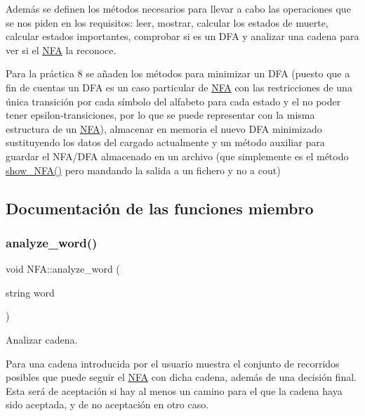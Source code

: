 Además se definen los métodos necesarios para llevar a cabo las operaciones que se nos piden en los requisitos\+: leer, mostrar, calcular los estados de muerte, calcular estados importantes, comprobar si es un D\+FA y analizar una cadena para ver si el \mbox{\hyperlink{class_n_f_a}{N\+FA}} la reconoce.

Para la práctica 8 se añaden los métodos para minimizar un D\+FA (puesto que a fin de cuentas un D\+FA es un caso particular de \mbox{\hyperlink{class_n_f_a}{N\+FA}} con las restricciones de una única transición por cada símbolo del alfabeto para cada estado y el no poder tener epsilon-\/transiciones, por lo que se puede representar con la misma estructura de un \mbox{\hyperlink{class_n_f_a}{N\+FA}}), almacenar en memoria el nuevo D\+FA minimizado sustituyendo los datos del cargado actualmente y un método auxiliar para guardar el N\+F\+A/\+D\+FA almacenado en un archivo (que simplemente es el método \mbox{\hyperlink{class_n_f_a_a53a6b0ddcfb706dc4725cf2a6a8f2388}{show\+\_\+\+N\+F\+A()}} pero mandando la salida a un fichero y no a cout) 

\subsection{Documentación de las funciones miembro}
\mbox{\label{class_n_f_a_a7cad5fd6ba765d9d8099793421100234}} 
\subsubsection{\texorpdfstring{analyze\+\_\+word()}{analyze\_word()}}
{\footnotesize\ttfamily void N\+F\+A\+::analyze\+\_\+word (\begin{DoxyParamCaption}\item[{string}]{word }\end{DoxyParamCaption})}



Analizar cadena. 

Para una cadena introducida por el usuario muestra el conjunto de recorridos posibles que puede seguir el \mbox{\hyperlink{class_n_f_a}{N\+FA}} con dicha cadena, además de una decisión final. Esta será de aceptación si hay al menos un camino para el que la cadena haya sido aceptada, y de no aceptación en otro caso. \mbox{\label{class_n_f_a_aaadda0fc1d4ebc279cbb25a8486a8b72}} 
